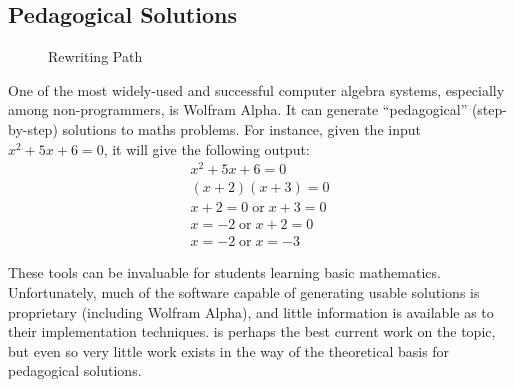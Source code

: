 \documentclass[draft, twocolumn]{article}
\theoremstyle{definition}
\theoremstyle{definition}
\begin{document}
\subsection{Pedagogical Solutions} \label{pedagogical} 
\begin{figure}[t]
  \centering
  \caption{Rewriting Path}
  \label{rewrite-graph}
\end{figure}
One of the most widely-used and successful computer algebra systems, especially
among non-programmers, is Wolfram
Alpha\cite{wolfram_research_inc._wolframalpha_2019}. It can generate
``pedagogical'' (step-by-step) solutions to maths
problems\cite{the_development_team_step-by-step_2009}. For instance, given the
input \(x^2 + 5 x + 6 = 0\), it will give the following output:
\begin{align*}
  x^2 + 5x + 6   = 0 \\
  (x + 2)(x + 3) = 0 \\
  x + 2 = 0   \; \text{or} \; x + 3 = 0 \\
  x     = -2  \; \text{or} \; x + 2 = 0 \\
  x     = -2  \; \text{or} \; x     = -3
\end{align*}

These tools can be invaluable for students learning basic mathematics.
Unfortunately, much of the software capable of generating usable solutions is
proprietary (including Wolfram Alpha), and little information is available as to
their implementation techniques.\cite{lioubartsev_constructing_2016} is perhaps
the best current work on the topic, but even so very little work exists in the
way of the theoretical basis for pedagogical solutions.
\end{document}
